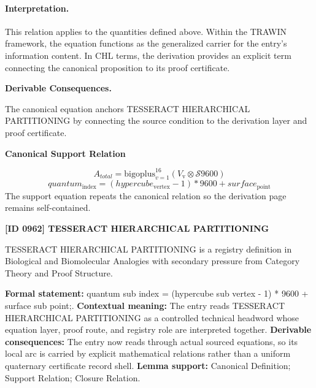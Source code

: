 \paragraph{Interpretation.}
This relation applies to the quantities defined above. Within the TRAWIN framework, the equation functions as the generalized carrier for the entry’s information content. In CHL terms, the derivation provides an explicit term connecting the canonical proposition to its proof certificate.

\par\vspace{0.35em}
\noindent\textbf{Derivable Consequences.}\quad
\begingroup
\footnotesize
\raggedright
The canonical equation anchors TESSERACT HIERARCHICAL PARTITIONING by connecting the source condition to the derivation layer and proof certificate.
\par\endgroup

\noindent\textbf{Canonical Support Relation}\par
\[
A_{total} = \mathrm{bigoplus}_{v=1}^{16} (V_{\mathrm{v}} \otimes \mathcal{S} {9600})
\]
\[
quantum_{\mathrm{index}} = (hypercube_{\mathrm{vertex}} - 1) * 9600 + surface_{\mathrm{point}}
\]
\noindent The support equation repeats the canonical relation so the derivation page remains self-contained.\par

\clearpage
\noindent\textbf{[ID 0962] TESSERACT HIERARCHICAL PARTITIONING}\par
\vspace{0.35em}
\begingroup\small
{}
TESSERACT HIERARCHICAL PARTITIONING is a registry definition in Biological and Biomolecular Analogies with secondary pressure from Category Theory and Proof Structure.

\begingroup\footnotesize\setlength{\emergencystretch}{3em}\sloppy
\textbf{Formal statement:} quantum sub index = (hypercube sub vertex - 1) * 9600 + surface sub point;. \textbf{Contextual meaning:} The entry reads TESSERACT HIERARCHICAL PARTITIONING as a controlled technical headword whose equation layer, proof route, and registry role are interpreted together. \textbf{Derivable consequences:} The entry now reads through actual sourced equations, so its local arc is carried by explicit mathematical relations rather than a uniform quaternary certificate record shell. \textbf{Lemma support:} Canonical Definition; Support Relation; Closure Relation.\par
\endgroup

